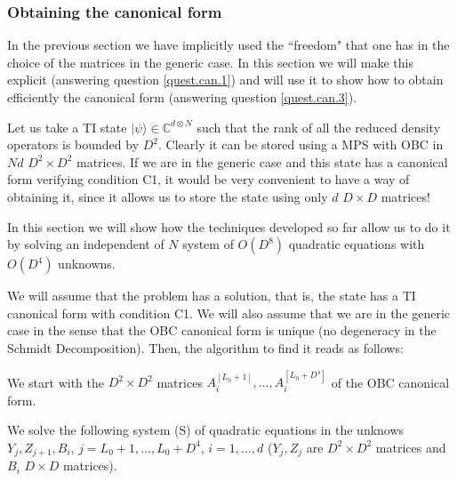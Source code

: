 \documentclass[aps,prl,epsfig,graphics,floatfix,mathbbm,a4paper]{article}
\newcommand{\1}{\mathbbm{1}}
\renewcommand{\>}{\rangle}
\newcommand{\<}{\langle}
\begin{document}
\subsubsection{Obtaining the canonical form}

In the previous section we have implicitly used the ``freedom"
that one has in the choice of the matrices in the generic case. In
this section we will make this explicit (answering question
\ref{quest.can.1}) and will use it to show how to obtain
efficiently the canonical form (answering question
\ref{quest.can.3}).

Let us take a TI state $|\psi\>\in\mathbb{C}^{d\otimes N}$ such
that the rank of all the reduced density operators is bounded by
$D^2$. Clearly it can be stored using a MPS with OBC in $Nd$
$D^2\times D^2$ matrices. If we are in the generic case and this
state has a canonical form verifying condition C1, it would be
very convenient to have a way of obtaining it, since it allows us
to store the state using only $d$ $D\times D$ matrices!

In this section we will show how the techniques developed so far
allow us to do it by solving an independent of $N$ system of
$O(D^8)$ quadratic equations with $O(D^4)$ unknowns.

We will assume that the problem has a solution, that is, the state
has a TI canonical form with condition C1. We will also assume
that we are in the generic case in the sense that the OBC
canonical form is unique (no degeneracy in the Schmidt
Decomposition). Then, the algorithm to find it reads as follows:

We start with the $D^2\times D^2$ matrices
$A^{[L_0+1]}_i,\ldots,A^{[L_0+D^4]}_i$ of the OBC canonical form.

We solve the following system (S) of quadratic equations in the
unknows $Y_j, Z_{j+1}, B_i$, $j=L_0+1,\ldots,L_0+D^4$,
$i=1,\ldots,d$ ($Y_j, Z_j$  are $D^2\times D^2$ matrices and $B_i$
$D\times D$ matrices).
\end{document}
